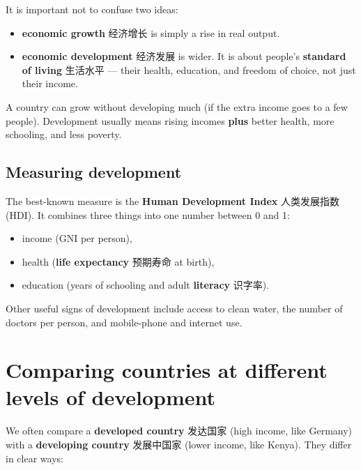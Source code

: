 \documentclass[11pt]{article}
\begin{document}
It is important not to confuse two ideas:

\begin{itemize}
\item \textbf{economic growth} 经济增长 is simply a rise in real output.

\item \textbf{economic development} 经济发展 is wider. It is about people's \textbf{standard of living} 生活水平 — their health, education, and freedom of choice, not just their income.

\end{itemize}

A country can grow without developing much (if the extra income goes to a few people). Development usually means rising incomes \textbf{plus} better health, more schooling, and less poverty.

\subsection*{Measuring development}

The best-known measure is the \textbf{Human Development Index} 人类发展指数 (HDI). It combines three things into one number between 0 and 1:

\begin{itemize}
\item income (GNI per person),

\item health (\textbf{life expectancy} 预期寿命 at birth),

\item education (years of schooling and adult \textbf{literacy} 识字率).

\end{itemize}

Other useful signs of development include access to clean water, the number of doctors per person, and mobile-phone and internet use.

\section*{Comparing countries at different levels of development}

We often compare a \textbf{developed country} 发达国家 (high income, like Germany) with a \textbf{developing country} 发展中国家 (lower income, like Kenya). They differ in clear ways:

\begin{center}
\end{center}
\end{document}
